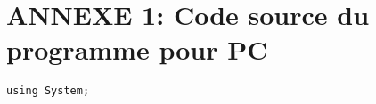 \section{ANNEXE 1: Code source du programme pour PC}
\begin{lstlisting}
using System;

\end{lstlisting}

